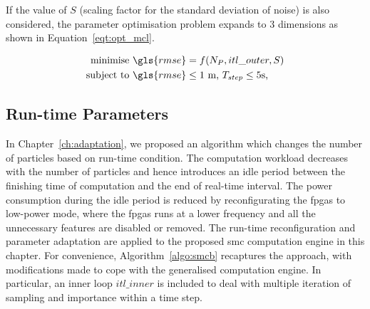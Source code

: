 If the value of $S$ (scaling factor for the standard deviation of noise) is also considered, the parameter optimisation problem expands to 3 dimensions as shown in Equation~\ref{eqt:opt_mcl}.

\begin{equation}
\begin{aligned}
\mbox{minimise } \gls{rmse} &= f(N_P, itl\_outer, S) \\
\mbox{subject to } \gls{rmse} & \leq \mbox{1 m, } T_{step} \leq \mbox{5s, } \\
\end{aligned}
\label{eqt:opt_mcl}
\end{equation}


\subsection{Run-time Parameters}

In Chapter~\ref{ch:adaptation}, we proposed an algorithm which changes the number of particles based on run-time condition.
The computation workload decreases with the number of particles and hence introduces an idle period between the finishing time of computation and the end of real-time interval.
The power consumption during the idle period is reduced by reconfigurating the \glspl{fpga} to low-power mode, where the \glspl{fpga} runs at a lower frequency and all the unnecessary features are disabled or removed.
The run-time reconfiguration and parameter adaptation are applied to the proposed \gls{smc} computation engine in this chapter.
For convenience, Algorithm~\ref{algo:smcb} recaptures the approach, with modifications made to cope with the generalised computation engine.
In particular, an inner loop $itl\_inner$ is included to deal with multiple iteration of sampling and importance within a time step.

